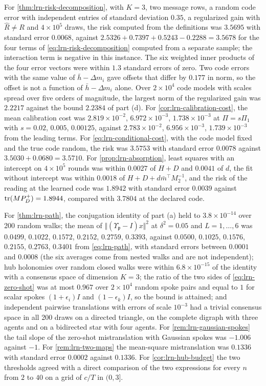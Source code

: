 \begin{numcheck}
For \cref{thm:lrn-risk-decomposition}, with $K=3$, two message rows, a random code error with independent entries of standard deviation $0.35$, a regularized gain with $\hat R\ne R$ and $4\times10^5$ draws, the risk computed from the definitions was $3.5695$ with standard error $0.0068$, against $2.5326+0.7397+0.5243-0.2288=3.5678$ for the four terms of \cref{eq:lrn-risk-decomposition} computed from a separate sample; the interaction term is negative in this instance. The six weighted inner products of the four error vectors were within $1.3$ standard errors of zero. Two code errors with the same value of $\bar h-\Delta m_i$ gave offsets that differ by $0.177$ in norm, so the offset is not a function of $\bar h-\Delta m_i$ alone. Over $2\times10^4$ code models with scales spread over five orders of magnitude, the largest norm of the regularized gain was $2.2217$ against the bound $2.2384$ of part (d). For \cref{cor:lrn-calibration-cost}, the mean calibration cost was $2.819\times10^{-2}$, $6.972\times10^{-3}$, $1.738\times10^{-3}$ at $\Pi=s\Pi_1$ with $s=0.02$, $0.005$, $0.00125$, against $2.783\times10^{-2}$, $6.956\times10^{-3}$, $1.739\times10^{-3}$ from the leading terms. For \cref{eq:lrn-conditional-cost}, with the code model fixed and the true code random, the risk was $3.5753$ with standard error $0.0078$ against $3.5030+0.0680=3.5710$. For \cref{prop:lrn-absorption}, least squares with an intercept on $4\times10^5$ rounds was within $0.0027$ of $H+D$ and $0.0041$ of $d$, the fit without intercept was within $0.0018$ of $H+D+d\bar m^\top M_2^{-1}$, and the risk of the reading at the learned code was $1.8942$ with standard error $0.0039$ against $\operatorname{tr}(MP^+_D)=1.8944$, compared with $3.7804$ at the declared code.

For \cref{thm:lrn-path}, the conjugation identity of part (a) held to $3.8\times10^{-14}$ over 200 random walks; the mean of $\Vert(\Upsilon_{\mathfrak p}-I)x\Vert^2$ at $\delta^2=0.05$ and $L=1,\dots,6$ was $0.0499$, $0.1022$, $0.1572$, $0.2152$, $0.2759$, $0.3393$, against $0.0500$, $0.1025$, $0.1576$, $0.2155$, $0.2763$, $0.3401$ from \cref{eq:lrn-path}, with standard errors between $0.0001$ and $0.0008$ (the six averages come from nested walks and are not independent); hub holonomies over random closed walks were within $6.8\times10^{-15}$ of the identity with a consensus space of dimension $K=3$; the ratio of the two sides of \cref{eq:lrn-zero-shot} was at most $0.967$ over $2\times10^4$ random spoke pairs and equal to $1$ for scalar spokes $(1+\epsilon_i)I$ and $(1-\epsilon_k)I$, so the bound is attained; and independent pairwise translations with errors of scale $10^{-3}$ had a trivial consensus space in all 200 draws on a directed triangle, on the complete digraph with three agents and on a bidirected star with four agents. For \cref{rem:lrn-gaussian-spokes} the tail slope of the zero-shot mistranslation with Gaussian spokes was $-1.006$ against $-1$. For \cref{rem:lrn-two-maps} the mean-square mistranslation was $0.1336$ with standard error $0.0002$ against $0.1336$. For \cref{cor:lrn-hub-budget} the two thresholds agreed with a direct comparison of the two expressions for every $n$ from $2$ to $40$ on a grid of $c/T$ in $(0,3]$.
\end{numcheck}
